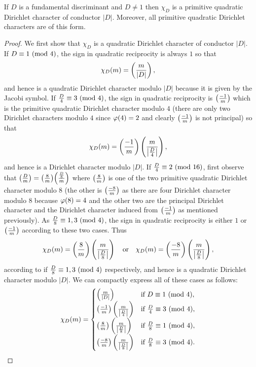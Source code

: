     \begin{theorem}\label{thm:fundamental_discriminant_character_primitive}
      If $D$ is a fundamental discriminant and $D \neq 1$ then $\chi_{D}$ is a primitive quadratic Dirichlet character of conductor $|D|$. Moreover, all primitive quadratic Dirichlet characters are of this form.
    \end{theorem}
    \begin{proof}
      We first show that $\chi_{D}$ is a quadratic Dirichlet character of conductor $|D|$. If $D \equiv 1 \ (\mathrm{mod}\text{ }4)$, the sign in quadratic reciprocity is always $1$ so that
      \[
        \chi_{D}(m) = \left(\frac{m}{|D|}\right),
      \]
      and hence is a quadratic Dirichlet character modulo $|D|$ because it is given by the Jacobi symbol. If $\frac{D}{4} \equiv 3 \ (\mathrm{mod}\text{ }4)$, the sign in quadratic reciprocity is $\textstyle{\left(\frac{-1}{m}\right)}$ which is the primitive quadratic Dirichlet character modulo $4$ (there are only two Dirichlet characters modulo $4$ since $\varphi(4) = 2$ and clearly $\left(\frac{-1}{m}\right)$ is not principal) so that
      \[
        \chi_{D}(m) = \left(\frac{-1}{m}\right)\left(\frac{m}{\left|\frac{D}{4}\right|}\right),
      \]
      and hence is a Dirichlet character modulo $|D|$. If $\frac{D}{4} \equiv 2 \ (\mathrm{mod}\text{ }16)$, first observe that $\textstyle{\left(\frac{D}{m}\right)} = \textstyle{\left(\frac{8}{m}\right)}\textstyle{\left(\frac{\frac{D}{8}}{m}\right)}$ where $\textstyle{\left(\frac{8}{m}\right)}$ is one of the two primitive quadratic Dirichlet character modulo $8$ (the other is $\textstyle{\left(\frac{-8}{m}\right)}$ as there are four Dirichlet character modulo $8$ because $\varphi(8) = 4$ and the other two are the principal Dirichlet character and the Dirichlet character induced from $\left(\frac{-1}{m}\right)$ as mentioned previously). As $\frac{D}{8} \equiv 1,3 \ (\mathrm{mod}\text{ }4)$, the sign in quadratic reciprocity is either $1$ or $\textstyle{\left(\frac{-1}{m}\right)}$ according to these two cases. Thus
      \[
        \chi_{D}(m) = \left(\frac{8}{m}\right)\left(\frac{m}{\left|\frac{D}{8}\right|}\right) \quad \text{or} \quad \chi_{D}(m) = \left(\frac{-8}{m}\right)\left(\frac{m}{\left|\frac{D}{8}\right|}\right),
      \]
      according to if $\frac{D}{8} \equiv 1,3 \ (\mathrm{mod}\text{ }4)$ respectively, and hence is a quadratic Dirichlet character modulo $|D|$. We can compactly express all of these cases as follows:
      \[
        \chi_{D}(m) = \begin{cases} \left(\frac{m}{|D|}\right) & \text{if $D \equiv 1 \ (\mathrm{mod}\text{ }4)$}, \\ \left(\frac{-1}{m}\right)\left(\frac{m}{\left|\frac{D}{4}\right|}\right) & \text{if $\frac{D}{4} \equiv 3 \ (\mathrm{mod}\text{ }4)$}, \\ \left(\frac{8}{m}\right)\left(\frac{m}{\left|\frac{D}{8}\right|}\right) & \text{if $\frac{D}{8} \equiv 1 \ (\mathrm{mod}\text{ }4)$}, \\ \left(\frac{-8}{m}\right)\left(\frac{m}{\left|\frac{D}{8}\right|}\right) & \text{if $\frac{D}{8} \equiv 3 \ (\mathrm{mod}\text{ }4)$}. \end{cases}
\]
\end{proof}
